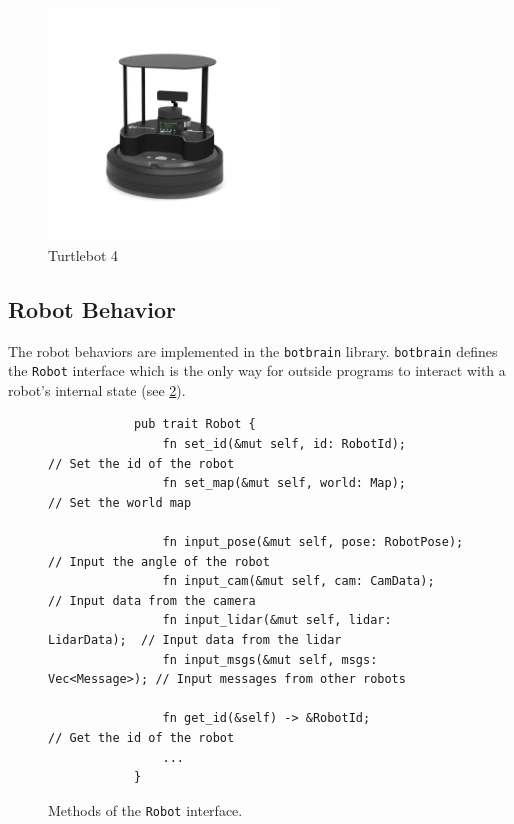 \begin{figure}[h]
    \begin{center}
        \includegraphics[width=0.55\textwidth]{figures/tb4.png}
    \end{center}
    \caption{Turtlebot 4}\label{fig:tb4}
\end{figure}

\subsection{Robot Behavior}
The robot behaviors are implemented in the \texttt{botbrain} library. \texttt{botbrain} defines the \texttt{Robot} interface
which is the only way for outside programs to interact with a robot’s internal state (see \cref{fig:robot-interface}).

\begin{figure}[H]
    \begin{center}
        \begin{verbatim}
            pub trait Robot {
                fn set_id(&mut self, id: RobotId);            // Set the id of the robot
                fn set_map(&mut self, world: Map);            // Set the world map

                fn input_pose(&mut self, pose: RobotPose);    // Input the angle of the robot
                fn input_cam(&mut self, cam: CamData);        // Input data from the camera
                fn input_lidar(&mut self, lidar: LidarData);  // Input data from the lidar
                fn input_msgs(&mut self, msgs: Vec<Message>); // Input messages from other robots

                fn get_id(&self) -> &RobotId;                 // Get the id of the robot
                ...
            }
        \end{verbatim}
    \end{center}
    \caption{Methods of the \texttt{Robot} interface.}\label{fig:robot-interface}
\end{figure}

